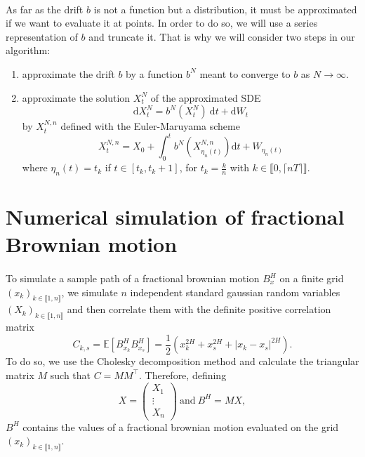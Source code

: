 \documentclass[12pt]{article}
\newcommand{\E}{\mathbb{E}}
\newcommand{\di}{\mathrm{d}}
\begin{document}
    \paragraph{}
    As far as the drift $b$ is not a function but a distribution, it must be approximated if we want to evaluate it at points. In order to do so, we will use a series representation of $b$ and truncate it. That is why we will consider two steps in our algorithm: \begin{enumerate}
        \item approximate the drift $b$ by a function $b^N$ meant to converge to $b$ as $N\rightarrow\infty$.
        \item approximate the solution $X^N_t$ of the approximated SDE
        \begin{equation} \label{sde2}
        \di X^N_t = b^N\left(X^N_t\right)\ \di t + \di W_t
        \end{equation} 
        by $X^{N,n}_t$ defined with the Euler-Maruyama scheme
        \begin{equation*}
        X^{N,n}_t = X_0 + \int_0^t b^N\left(X^{N,n}_{\eta_n(t)}\right)\di t + W_{\eta_n(t)}
        \end{equation*}
        where $\eta_n(t)=t_k$ if $t\in[t_k,t_k+1]$, for $t_k=\frac{k}{n}$ with $ k\in\llbracket0,\lceil nT\rceil\rrbracket$.
        
    \end{enumerate}

\section{Numerical simulation of fractional Brownian motion}    
    \paragraph{}
    To simulate a sample path of a fractional brownian motion $B^H_x$ on a finite grid $(x_k)_{k\in\llbracket1,n\rrbracket}$, we simulate $n$ independent standard gaussian random variables $(X_k)_{k\in\llbracket1,n\rrbracket}$ and then correlate them with the definite positive correlation matrix 
    $$C_{k,s}=\E\left[B_{x_k}^HB_{x_s}^H\right]=\frac{1}{2}\left(x_k^{2H}+x_s^{2H}+|x_k-x_s|^{2H}\right).$$
    To do so, we use the Cholesky decomposition method and calculate the triangular matrix $M$ such that $C=MM^\top$. Therefore, defining
    $$X = \begin{pmatrix}
    X_1 \\ \vdots \\ X_n
    \end{pmatrix}\ \mathrm{and}\ B^H = MX,$$
    $B^H$ contains the values of a fractional brownian motion evaluated on the grid $(x_k)_{k\in\llbracket1,n\rrbracket}$.
    
\end{document}
